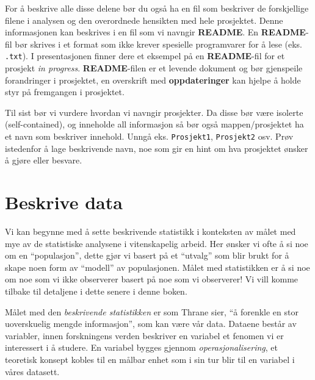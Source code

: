 \documentclass[
  letterpaper,
  DIV=11,
  numbers=noendperiod,
  oneside]{scrreprt}
\begin{document}
For å beskrive alle disse delene bør du også ha en fil som beskriver de
forskjellige filene i analysen og den overordnede hensikten med hele
prosjektet. Denne informasjonen kan beskrives i en fil som vi navngir
\textbf{README}. En \textbf{README}-fil bør skrives i et format som ikke
krever spesielle programvarer for å lese (eks. \texttt{.txt}). I
presentasjonen finner dere et eksempel på en \textbf{README}-fil for et
prosjekt \emph{in progress}. \textbf{README}-filen er et levende
dokument og bør gjenspeile forandringer i prosjektet, en overskrift med
\textbf{oppdateringer} kan hjelpe å holde styr på fremgangen i
prosjektet.

Til sist bør vi vurdere hvordan vi navngir prosjekter. Da disse bør være
isolerte (self-contained), og inneholde all informasjon så bør også
mappen/prosjektet ha et navn som beskriver innehold. Unngå eks.
\texttt{Prosjekt1}, \texttt{Prosjekt2} osv. Prøv istedenfor å lage
beskrivende navn, noe som gir en hint om hva prosjektet ønsker å gjøre
eller besvare.

\hypertarget{beskrive-data}{%
\section{Beskrive data}\label{beskrive-data}}


Vi kan begynne med å sette beskrivende statistikk i konteksten av målet
med mye av de statistiske analysene i vitenskapelig arbeid. Her ønsker
vi ofte å si noe om en ``populasjon'', dette gjør vi basert på et
``utvalg'' som blir brukt for å skape noen form av ``modell'' av
populasjonen. Målet med statistikken er å si noe om noe som vi ikke
observerer basert på noe som vi observerer! Vi vill komme tilbake til
detaljene i dette senere i denne boken.

Målet med den \emph{beskrivende statistikken} er som Thrane sier, ``å
forenkle en stor uoverskuelig mengde informasjon'', som kan være vår
data. Dataene består av variabler, innen forskningens verden beskriver
en variabel et fenomen vi er interessert i å studere. En variabel bygges
gjennom \emph{operasjonalisering}, et teoretisk konsept kobles til en
målbar enhet som i sin tur blir til en variabel i våres datasett.
\end{document}
